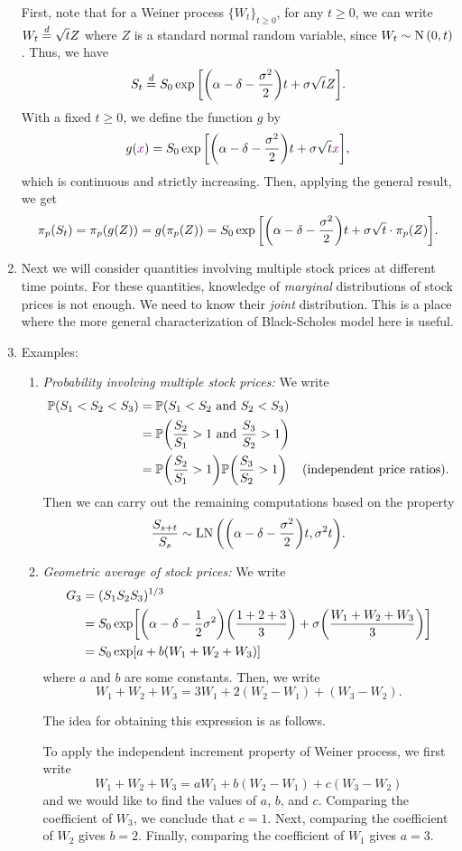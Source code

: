 \begin{enumerate}
\begin{pf}
First, note that for a Weiner process \(\{W_t\}_{t\ge 0}\), for any \(t\ge 0\),
we can write \(W_t\overset{d}=\sqrt{t}Z\) where \(Z\) is a standard normal random
variable, since \(W_t\sim \operatorname{N}\qty(0,t)\). Thus, we have
\[
S_t\overset{d}= S_0\exp\qty[\qty(\alpha-\delta-\frac{\sigma^2}{2})t+\sigma\sqrt{t}Z].
\]
With a fixed \(t\ge 0\), we define the function \(g\) by
\[
g({\color{violet}x})=S_0\exp\qty[\qty(\alpha-\delta-\frac{\sigma^2}{2})t+\sigma\sqrt{t}{\color{violet}x}],
\]
which is continuous and strictly increasing. Then, applying the general result,
we get
\[
\pi_p(S_t)=\pi_p(g(Z))=g(\pi_p(Z))=S_0\exp\qty[\qty(\alpha-\delta-\frac{\sigma^2}{2})t + \sigma\sqrt{t}\cdot \pi_{p}(Z)].
\]
\end{pf}
\item Next we will consider quantities involving multiple stock prices at
different time points. For these quantities, knowledge of \emph{marginal}
distributions of stock prices is not enough. We need to know their \emph{joint}
distribution. This is a place where the more general characterization of
Black-Scholes model here is useful.

\item Examples:
\begin{enumerate}
\item \emph{Probability involving multiple stock prices:} We write
\begin{align*}
\mathbb{P}\qty(S_1<S_2<S_3)
&=\mathbb{P}\qty(S_1<S_2\text{ and }S_2<S_3) \\
&=\mathbb{P}\qty(\frac{S_2}{S_1}>1\text{ and }\frac{S_3}{S_2}>1) \\
&=\mathbb{P}\qty(\frac{S_2}{S_1}>1)\mathbb{P}\qty(\frac{S_3}{S_2}>1)&\text{(independent price ratios)}.
\end{align*}
Then we can carry out the remaining computations based on the property
\[
\frac{S_{s+t}}{S_s}\sim \operatorname{LN}\qty(\qty(\alpha-\delta-\frac{\sigma^2}{2})t,\sigma^{2}t).
\]
\item \emph{Geometric average of stock prices:} We write
\begin{align*}
G_3&=(S_1S_2S_3)^{1/3}\\
&=S_0\exp[\qty(\alpha-\delta-\frac{1}{2}\sigma^2)\qty(\frac{1+2+3}{3})+\sigma\qty(\frac{W_1+W_2+W_3}{3})] \\
&=S_0\exp[a+b(W_1+W_2+W_3)]
\end{align*}
where \(a\) and \(b\) are some constants. Then, we write
\[
W_1+W_2+W_3=3W_1+2(W_2-W_1)+(W_3-W_2).
\]
\begin{note}
The idea for obtaining this expression is as follows.

To apply the independent increment property of Weiner process, we first write
\[
W_1+W_2+W_3=aW_1+b(W_2-W_1)+c(W_3-W_2)
\]
and we would like to find the values of \(a\), \(b\), and \(c\). Comparing the
coefficient of \(W_3\), we conclude that \(c=1\). Next, comparing the
coefficient of \(W_2\) gives \(b=2\). Finally, comparing the coefficient of
\(W_1\) gives \(a=3\).
\end{note}


\end{enumerate}
\end{enumerate}
